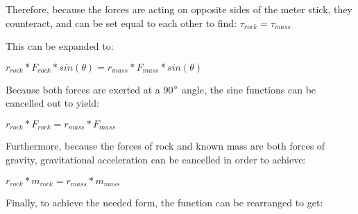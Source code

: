 \documentclass[12pt]{article}
\begin{document}
\newline

\begin{justify}

Therefore, because the forces are acting on opposite sides of the meter stick, they counteract, and can be set equal to each other to find:
\hspace{100pt} $\tau_{rock} = \tau_{mass}$

\vspace{14pt}

\flushleft This can be expanded to:

\end{justify}

\begin{center}
    
$r_{rock}*F_{rock}*sin(\theta) = r_{mass}*F_{mass}*sin(\theta)$
    
\end{center}

\begin{justify}

Because both forces are exerted at a 90$\degree$ angle, the sine functions can be cancelled out to yield:

\end{justify}

\begin{center}
    
$r_{rock}*F_{rock} = r_{mass}*F_{mass}$
    
\end{center}

\begin{justify}

Furthermore, because the forces of rock and known mass are both forces of gravity, gravitational acceleration can be cancelled in order to achieve:

\end{justify}

\begin{center}
    
$r_{rock}*m_{rock} = r_{mass}*m_{mass}$
    
\end{center}

\begin{justify}

Finally, to achieve the needed form, the function can be rearranged to get:

\end{justify}
\end{document}
